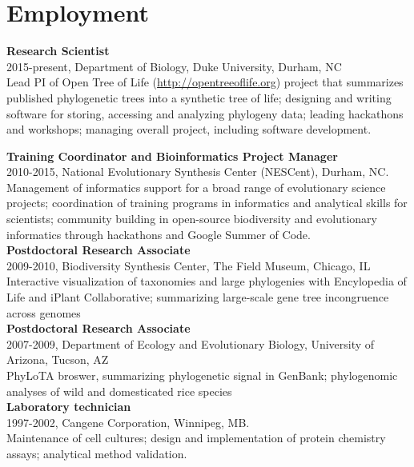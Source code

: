 \documentclass[10pt]{article}
\begin{document}
\section*{Employment}

\noindent \textbf{Research Scientist} \\
2015-present, Department of Biology, Duke University, Durham, NC \\
Lead PI of Open Tree of Life (\url{http://opentreeoflife.org}) project that summarizes published phylogenetic trees into a synthetic tree of life; designing and writing software for storing, accessing and analyzing phylogeny data; leading hackathons and workshops; managing overall project, including software development.

\noindent \textbf{Training Coordinator and Bioinformatics Project Manager} \\
2010-2015, National Evolutionary Synthesis Center (NESCent), Durham, NC. \\
Management of informatics support for a broad range of evolutionary science projects; coordination of training programs in informatics and analytical skills for scientists; community building in open-source biodiversity and evolutionary informatics through hackathons and Google Summer of Code. \\

\noindent \textbf{Postdoctoral Research Associate} \\
2009-2010, Biodiversity Synthesis Center, The Field Museum, Chicago, IL  \\
Interactive visualization of taxonomies and large phylogenies with Encylopedia of Life and iPlant Collaborative; summarizing large-scale gene tree incongruence across genomes \\

\noindent \textbf{Postdoctoral Research Associate} \\
2007-2009, Department of Ecology and Evolutionary Biology, University of Arizona, Tucson, AZ \\
PhyLoTA broswer, summarizing phylogenetic signal in GenBank; phylogenomic analyses of wild and domesticated rice species \\ 

\noindent \textbf{Laboratory technician} \\
1997-2002, Cangene Corporation, Winnipeg, MB. \\
Maintenance of cell cultures; design and implementation of protein chemistry assays; analytical method validation. \\
\end{document}
